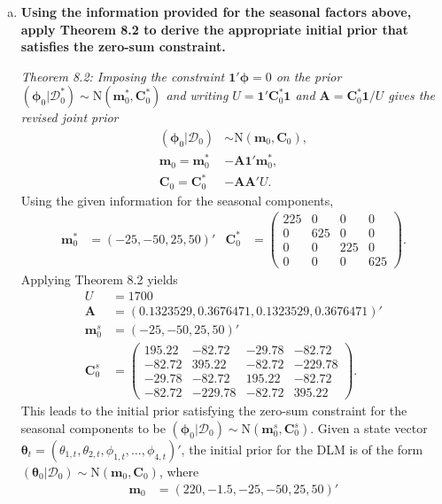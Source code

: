 \documentclass{article}
\newcommand{\bone}{\mathbf{1}}
\newcommand{\bphi}{\boldsymbol{\phi}}
\newcommand{\sD}{\mathcal{D}}
\newcommand{\bm}{\mathbf{m}}
\newcommand{\bC}{\mathbf{C}}
\newcommand{\bA}{\mathbf{A}}
\newcommand{\btheta}{\boldsymbol{\theta}}
\begin{document}
	\begin{enumerate}[(a)]
		\item \textbf{Using the information provided for the seasonal factors above, apply Theorem 8.2 to derive the appropriate initial prior that satisfies the zero-sum constraint.}
		
		\textit{Theorem 8.2: Imposing the constraint $\bone'\bphi = 0$ on the prior $(\bphi_0|\sD_0^*) \sim \text{N}(\bm_0^*,\bC_0^*)$ and writing $U = \bone'\bC_0^*\bone$ and $\bA = \bC_0^*\bone/U$ gives the revised joint prior}
		\begin{align*}
			(\bphi_0|\sD_0) & \sim \text{N}(\bm_0,\bC_0),\\
			\bm_0 = \bm_0^* & - \bA\bone'\bm_0^*,\\
			\bC_0 = \bC_0^* & - \bA\bA'U.
		\end{align*} 
		Using the given information for the seasonal components,
		\begin{align*}
			\bm_0^* & = (-25,-50,25,50)' &
			\bC_0^* & = \begin{pmatrix}
				225 & 0 & 0 & 0 \\
				0 & 625 & 0 & 0 \\
				0 & 0 & 225 & 0 \\
				0 & 0 & 0 & 625
			\end{pmatrix}.
		\end{align*}
		Applying Theorem 8.2 yields
		\begin{align*}
			U & = 1700 \\ \bA & = (0.1323529, 0.3676471, 0.1323529, 0.3676471)' \\
			\bm_0^s & = (-25,-50,25,50)' \\
			\bC_0^s & = \begin{pmatrix}
			195.22 & -82.72 & -29.78 & -82.72 \\ 
			-82.72 & 395.22 & -82.72 & -229.78 \\ 
			-29.78 & -82.72 & 195.22 & -82.72 \\ 
			-82.72 & -229.78 & -82.72 & 395.22 
			\end{pmatrix}.
		\end{align*}
		This leads to the initial prior satisfying the zero-sum constraint for the seasonal components to be $(\bphi_0|\sD_0) \sim \text{N}(\bm_0^s,\bC_0^s)$. Given a state vector $\btheta_t = (\theta_{1,t},\theta_{2,t},\phi_{1,t},\ldots,\phi_{4,t})'$, the initial prior for the DLM is of the form $(\btheta_0|\sD_0) \sim \text{N}(\bm_0,\bC_0)$, where
		\begin{align*}
			\bm_0 & = (220,-1.5, -25, -50,  25,  50)' \\

\end{align*}
\end{enumerate}
\end{document}

